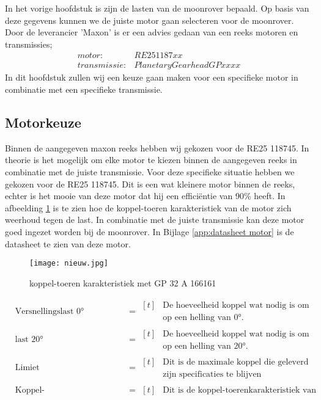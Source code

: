 In het vorige hoofdstuk is zijn de lasten van de moonrover bepaald. Op basis van deze gegevens kunnen we de juiste motor gaan selecteren voor de moonrover. Door de leverancier 'Maxon' is er een advies gedaan van een reeks motoren en transmissies;
\begin{align*}
        motor: &RE25 1187xx\\
        transmissie: &Planetary Gearhead GP xx xx
\end{align*}
In dit hoofdstuk zullen wij een keuze gaan maken voor een specifieke motor in combinatie met een specifieke transmissie.


\subsection{Motorkeuze}
Binnen de aangegeven maxon reeks hebben wij gekozen voor de RE25 118745. In theorie is het mogelijk om elke motor te kiezen binnen de aangegeven reeks in combinatie met de juiste transmissie. Voor deze specifieke situatie hebben we gekozen voor de RE25 118745. Dit is een wat kleinere motor binnen de reeks, echter is het mooie van deze motor dat hij een efficiëntie van 90\% heeft. In afbeelding \ref{fig:motor} is te zien hoe de koppel-toeren karakteristiek van de motor zich weerhoud tegen de last. In combinatie met de juiste transmissie kan deze motor goed ingezet worden bij de moonrover. In Bijlage \ref{app:datasheet motor} is de datasheet te zien van deze motor.
\begin{figure}[H]
        \centering
        \texttt{[image: nieuw.jpg]}
        \caption{koppel-toeren karakteristiek met GP 32 A 166161}
        \label{fig:motor}
\end{figure}

\begin{align*}
        & \text{Versnellingslast 0°} &&= \begin{aligned}[t] & \text{De hoeveelheid koppel wat nodig is om maximaal te versnellen} \\ & \text{op een helling van 0°.} \end{aligned}\\
        & \text{last 20°} &&= \begin{aligned}[t] & \text{De hoeveelheid koppel wat nodig is om stil te blijven staan} \\ & \text{op een helling van 20°.} \end{aligned}\\
        & \text{Limiet} &&= \begin{aligned}[t] & \text{Dit is de maximale koppel die geleverd mag worden om binnen}\\ & \text{zijn specificaties te blijven} \end{aligned}\\
        & \text{Koppel-toerenkarakteristiek motor} &&= \begin{aligned}[t] & \text{Dit is de koppel-toerenkarakteristiek van de motor.} \end{aligned}
    \end{align*}

